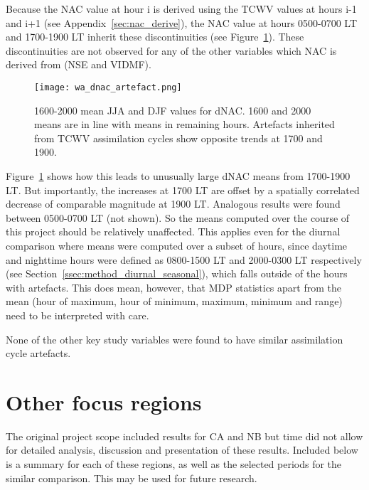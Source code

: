 Because the \ac{NAC} value at hour i is derived using the \ac{TCWV} values at hours i-1 and i+1 (see Appendix~\ref{sec:nac_derive}), the \ac{NAC} value at hours 0500-0700 \ac{LT} and 1700-1900 \ac{LT} inherit these discontinuities (see Figure~\ref{fig:wa_dnac_artefact}). These discontinuities are not observed for any of the other variables which \ac{NAC} is derived from (\ac{NSE} and \ac{VIDMF}).

\begin{figure}[!htp]
	\centering
	\texttt{[image: wa\_dnac\_artefact.png]}
	\caption[1600-2000 means for dNAC (artefacts)]{1600-2000 mean \ac{JJA} and \ac{DJF} values for \acs{dNAC}. 1600 and 2000 means are in line with means in remaining hours. Artefacts inherited from \ac{TCWV} assimilation cycles show opposite trends at 1700 and 1900.}
	\label{fig:wa_dnac_artefact}
\end{figure}

Figure~\ref{fig:wa_dnac_artefact} shows how this leads to unusually large \ac{dNAC} means from 1700-1900 \ac{LT}. But importantly, the increases at 1700 \ac{LT} are offset by a spatially correlated decrease of comparable magnitude at 1900 \ac{LT}. Analogous results were found between 0500-0700 \ac{LT} (not shown). So the means computed over the course of this project should be relatively unaffected. This applies even for the diurnal comparison where means were computed over a subset of hours, since daytime and nighttime hours were defined as 0800-1500 \ac{LT} and 2000-0300 \ac{LT} respectively (see Section~\ref{ssec:method_diurnal_seasonal}), which falls outside of the hours with artefacts. This does mean, however, that \ac{MDP} statistics apart from the mean (hour of maximum, hour of minimum, maximum, minimum and range) need to be interpreted with care. 

None of the other key study variables were found to have similar assimilation cycle artefacts.

\newpage

\section{Other focus regions}
\label{sec:other_regions}

The original project scope included results for \ac{CA} and \ac{NB} but time did not allow for detailed analysis, discussion and presentation of these results. Included below is a summary for each of these regions, as well as the selected periods for the similar comparison. This may be used for future research.

